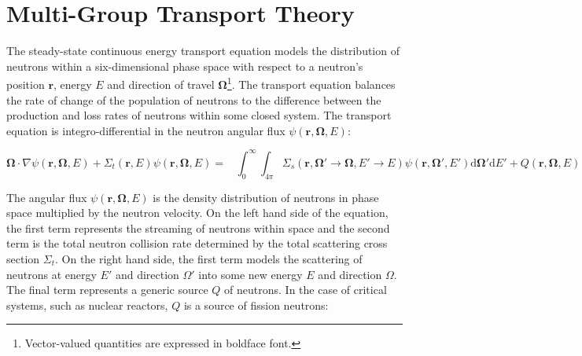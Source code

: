 \chapter{Multi-Group Transport Theory}
\label{chap:mgxs}


The steady-state continuous energy transport equation models the distribution of neutrons within a six-dimensional phase space with respect to a neutron's position $\mathbf{r}$, energy $E$ and direction of travel $\mathbf{\Omega}$\footnote{Vector-valued quantities are expressed in boldface font.}. The transport equation balances the rate of change of the population of neutrons to the difference between the production and loss rates of neutrons within some closed system. The transport equation is integro-differential in the neutron angular flux $\psi(\mathbf{r},\mathbf{\Omega},E)$:

\begin{dmath}
\label{eqn:chap1-eqn1}
\mathbf{\Omega} \cdot \nabla \psi(\mathbf{r},\mathbf{\Omega},E) + \Sigma_{t}(\mathbf{r},E)\psi(\mathbf{r},\mathbf{\Omega},E) = \;\;\; \int_{0}^{\infty}\int_{4\pi} \Sigma_{s}(\mathbf{r},{\mathbf{\Omega'}\rightarrow\mathbf{\Omega}},{E'\rightarrow E}) \psi(\mathbf{r},\mathbf{\Omega'},E') \mathrm{d}\mathbf{\Omega'} \mathrm{d}E' + Q(\mathbf{r},\mathbf{\Omega},E)
\end{dmath}

The angular flux $\psi(\mathbf{r},\mathbf{\Omega},E)$ is the density distribution of neutrons in phase space multiplied by the neutron velocity. On the left hand side of the equation, the first term represents the streaming of neutrons within space and the second term is the total neutron collision rate determined by the total scattering cross section $\Sigma_{t}$. On the right hand side, the first term models the scattering of neutrons at energy $E'$ and direction $\Omega'$ into some new energy $E$ and direction $\Omega$. The final term represents a generic source $Q$ of neutrons. In the case of critical systems, such as nuclear reactors, $Q$ is a source of fission neutrons:


